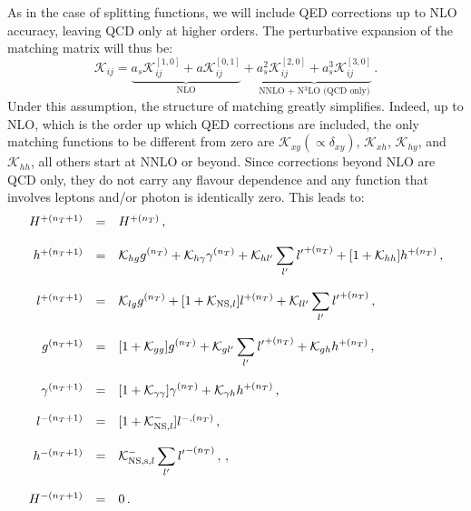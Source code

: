\documentclass[10pt,a4paper]{article}
\begin{document}
As in the case of splitting functions, we will include QED corrections
up to NLO accuracy, leaving QCD only at higher orders. The
perturbative expansion of the matching matrix will thus be:
\begin{equation}
\mathcal{K}_{ij}=\underbrace{a_s \mathcal{K}_{ij}^{[1,0]}+a\mathcal{K}_{ij}^{[0,1]}}_{\mbox{NLO}}+\underbrace{a_s^2 \mathcal{K}_{ij}^{[2,0]}+a_s^3\mathcal{K}_{ij}^{[3,0]}}_{\mbox{NNLO + N$^3$LO (QCD only)}}\,.
\end{equation}
Under this assumption, the structure of matching greatly
simplifies. Indeed, up to NLO, which is the order up which QED
corrections are included, the only matching functions to be different
from zero are $\mathcal{K}_{xy}(\propto \delta_{xy})$,
$\mathcal{K}_{xh}$, $\mathcal{K}_{hy}$, and
$\mathcal{K}_{hh}$, all others start at NNLO or beyond. Since
corrections beyond NLO are QCD only, they do not carry any flavour
dependence and any function that involves leptons and/or photon is
identically zero. This leads to:
\begin{equation}
\begin{array}{rcl}
  H^{+(n_T+1)} &=& H^{+(n_T)}\,,\\
\\
   h^{+(n_T+1)}&=&\displaystyle \mathcal{K}_{hg}g^{(n_T)} + \mathcal{K}_{h \gamma}\gamma^{(n_T)} +\mathcal{K}_{hl'}\sum_{l'} {l'}^{+(n_T)}+[1+\mathcal{K}_{hh}]h^{+(n_T)}\,,\\
  \\
   l^{+(n_T+1)}&=&\displaystyle \mathcal{K}_{lg}g^{(n_T)}+[1+\mathcal{K}_{{\rm NS},l}]l^{+(n_T)}+\mathcal{K}_{ll'} \sum_{l'} {l'}^{+(n_T)}\,,\\
  \\
   g^{(n_T+1)}&=&\displaystyle [1+\mathcal{K}_{gg}]g^{(n_T)}+\mathcal{K}_{gl'} \sum_{l'}{l'}^{+(n_T)} + \mathcal{K}_{gh}h^{+(n_T)}\,,\\
\\
   \gamma^{(n_T+1)}&=&\displaystyle[1+\mathcal{K}_{\gamma\gamma}]\gamma^{(n_T)}+\mathcal{K}_{\gamma h}h^{+(n_T)}\,,\\
  \\
  l^{-(n_T+1)} &=& [1+\mathcal{K}_{{\rm NS},l}^-]l^{-,(n_T)}\,,\\
\\
  h^{-(n_T+1)} &=& \displaystyle\mathcal{K}_{{\rm NS,s},l}^-\sum_{l'}{l'}^{-(n_T)}\,,\,,\\
\\
  H^{-(n_T+1)} &=& 0\,.
\end{array}
\end{equation}
\end{document}
